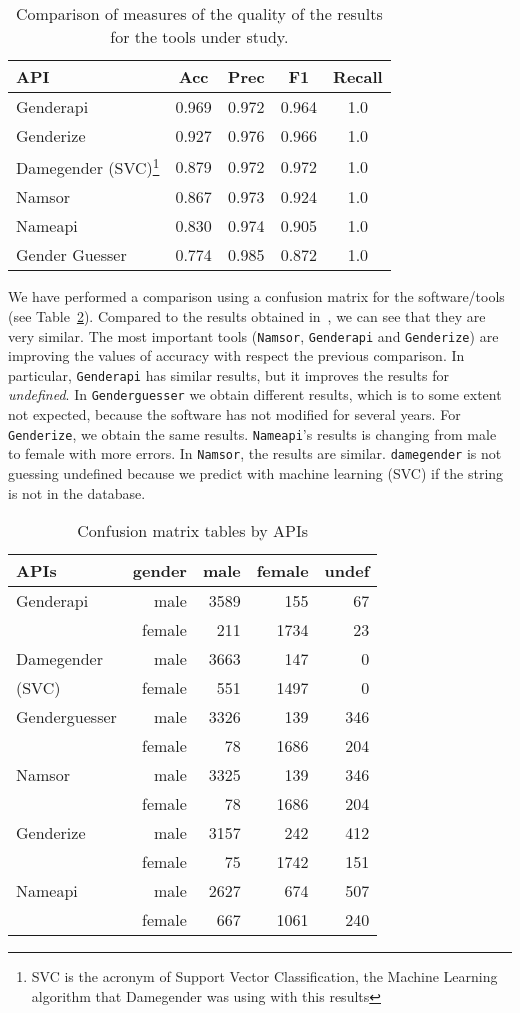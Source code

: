\documentclass[a4paper]{article}
\begin{document}
\begin{table}[t]
\footnotesize
\begin{tabular}[]{lcccc}
  \hline
  API & Acc & Prec & F1 & Recall\tabularnewline
\hline
Genderapi & 0.969 & 0.972 & 0.964 & 1.0\tabularnewline
Genderize & 0.927 & 0.976 & 0.966 & 1.0\tabularnewline
Damegender (SVC)\footnote{SVC is the acronym of Support Vector Classification, the Machine Learning algorithm that Damegender was using with this results} & 0.879 & 0.972 & 0.972 & 1.0\tabularnewline
Namsor & 0.867 & 0.973 & 0.924 & 1.0\tabularnewline
Nameapi & 0.830 & 0.974 & 0.905 & 1.0\tabularnewline
Gender Guesser & 0.774 & 0.985 & 0.872 & 1.0\tabularnewline
\hline
\end{tabular}
\caption{Comparison of measures of the quality of the results for the tools under study.}
\label{table:DifferentAccuraciesMeasures}
\end{table}

We have performed a comparison using a confusion matrix for the software/tools (see Table~\ref{table:ConfusionMatrixTables}).
Compared to the results obtained in~\cite{10.7717/peerj-cs.156}, we can see that they are very similar.
The most important tools (\texttt{Namsor}, \texttt{Genderapi} and \texttt{Genderize}) are improving the values of accuracy with respect the previous comparison.
In particular, \texttt{Genderapi} has similar results, but it improves the results for \emph{undefined}.
In \texttt{Genderguesser} we obtain different results, which is to some extent not expected, because the software has not modified for several years.
For \texttt{Genderize}, we obtain the same results. 
\texttt{Nameapi}'s results is changing from male to female with more errors. 
In \texttt{Namsor}, the results are similar. 
\texttt{damegender} is not guessing undefined because we predict with machine learning (SVC) if the string is not in the database.

\begin{table}[t]
\footnotesize
\begin{tabular}[]{lrrrr}
  \hline
  APIs          & gender & male & female & undef \tabularnewline
\hline
Genderapi         & male    & 3589 & 155  &  67 \tabularnewline
                  & female  & 211  & 1734 &  23 \tabularnewline
Damegender       & male    & 3663 & 147  &   0 \tabularnewline
(SVC)\footnotemark[1] & female  & 551  & 1497 &   0 \tabularnewline
Genderguesser     & male    & 3326 &  139 & 346 \tabularnewline
                  & female  & 78   & 1686 & 204 \tabularnewline
Namsor            & male    & 3325 & 139  & 346 \tabularnewline
                  & female  & 78   & 1686 & 204 \tabularnewline
Genderize         & male    & 3157 & 242  & 412 \tabularnewline
                  & female  & 75   & 1742 & 151 \tabularnewline
Nameapi           & male    & 2627 & 674  & 507 \tabularnewline
                  & female  & 667  & 1061 & 240 \tabularnewline 
\hline
\end{tabular}
\caption{Confusion matrix tables by APIs}
\label{table:ConfusionMatrixTables}
\end{table}
\end{document}
